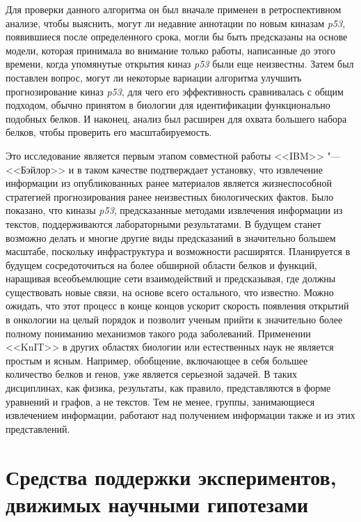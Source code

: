 Для проверки данного алгоритма он был вначале применен в ретроспективном анализе, чтобы выяснить, могут ли недавние 
аннотации по новым киназам \textit{p53}, появившиеся после определенного срока, могли бы быть предсказаны на основе 
модели, которая принимала во внимание только работы, написанные до этого времени, когда упомянутые открытия киназ 
\textit{p53} были еще неизвестны. Затем был поставлен вопрос, могут ли некоторые вариации алгоритма улучшить 
прогнозирование киназ \textit{p53}, для чего его эффективность сравнивалась с общим подходом, обычно принятом в 
биологии для идентификации функционально подобных белков. И наконец, анализ был расширен для охвата большего набора 
белков, чтобы проверить его масштабируемость.

Это исследование является первым этапом совместной работы <<IBM>> "--- <<Бэйлор>> и в таком качестве подтверждает 
установку, что извлечение информации из опубликованных ранее материалов является жизнеспособной стратегией 
прогнозирования ранее неизвестных биологических фактов. Было показано, что киназы \textit{p53}, предсказанные методами 
извлечения информации из текстов, поддерживаются лабораторными результатами. В будущем станет возможно делать и многие 
другие виды предсказаний в значительно большем масштабе, поскольку инфраструктура и возможности расширятся. Планируется 
в будущем сосредоточиться на более обширной области белков и функций, наращивая всеобъемлющие сети взаимодействий и 
предсказывая, где должны существовать новые связи, на основе всего остального, что известно. Можно ожидать, что этот 
процесс в конце концов ускорит скорость появления открытий в онкологии на целый порядок и позволит ученым прийти к 
значительно более полному пониманию механизмов такого рода заболеваний. Применении <<KnIT>> в других областях биологии 
или естественных наук не является простым и ясным. Например, обобщение, включающее в себя большее количество белков и 
генов, уже является серьезной задачей. В таких дисциплинах, как физика, результаты, как правило, представляются в форме 
уравнений и графов, а не текстов. Тем не менее, группы, занимающиеся извлечением информации, работают над получением 
информации также и из этих представлений.


\section{Средства поддержки экспериментов, движимых научными гипотезами}\label{sect1_3}

